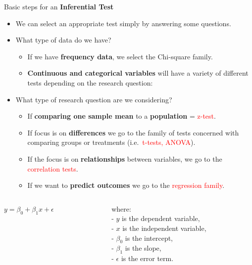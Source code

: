 \documentclass[
  ignorenonframetext,
]{beamer}
\providecommand{\tightlist}{%
  \setlength{\itemsep}{0pt}\setlength{\parskip}{0pt}}
\begin{document}
\begin{frame}{Basic steps for an \textbf{Inferential Test}}
\label{basic-steps-for-an-inferential-test-2}
\begin{itemize}
\item
  We can select an appropriate test simply by answering some questions.
\item
  What type of data do we have?

  \begin{itemize}
  \tightlist
  \item
    If we have \textbf{frequency data}, we select the Chi-square family.
  \item
    \textbf{Continuous and categorical variables} will have a variety of
    different tests depending on the research question:
  \end{itemize}
\item
  What type of research question are we considering?

  \begin{itemize}
  \tightlist
  \item
    If \textbf{comparing one sample mean} to a \textbf{population} =
    \textcolor{red}{z-test}.
  \item
    If focus is on \textbf{differences} we go to the family of tests
    concerned with comparing groups or treatments
    (i.e.~\textcolor{red}{t-tests, ANOVA}).
  \item
    If the focus is on \textbf{relationships} between variables, we go
    to the \textcolor{red}{correlation tests}.
  \item
    If we want to \textbf{predict outcomes} we go to the
    \textcolor{red}{regression family}.
  \end{itemize}
\end{itemize}

\begin{columns}[T]
\begin{column}{0.4\textwidth}
\centering

\(y = \beta_0 + \beta_1 x + \epsilon\)
\end{column}

\begin{column}{0.6\textwidth}
where:\\
- \(y\) is the dependent variable,\\
- \(x\) is the independent variable,\\
- \(\beta_0\) is the intercept,\\
- \(\beta_1\) is the slope,\\
- \(\epsilon\) is the error term.
\end{column}
\end{columns}
\end{frame}
\end{document}
